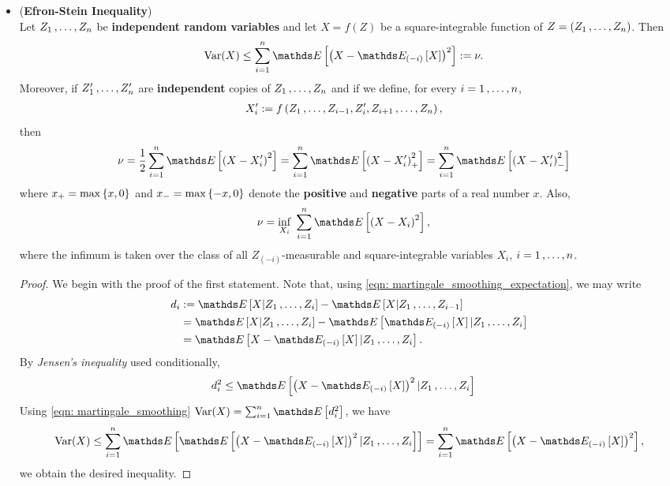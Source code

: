 \documentclass[11pt]{article}
\begin{document}
\begin{itemize}
\item \begin{proposition}(\textbf{Efron-Stein Inequality}) \citep{boucheron2013concentration} \\
Let $Z_1 \,{,}\ldots{,}\, Z_n$ be \textbf{independent random variables} and let $X = f(Z)$ be a square-integrable function of $Z = (Z_1 \,{,}\ldots{,}\, Z_n)$. Then
\begin{align}
\text{Var}(X) &\le  \sum_{i=1}^{n}\E{}{\paren{X - \E{(-i)}{X}}^2} := \nu.  \label{ineqn: efron_stein_inequality}
\end{align}
Moreover, if $Z_1' \,{,}\ldots{,}\, Z_n'$ are \textbf{independent} copies of $Z_1 \,{,}\ldots{,}\, Z_n$ and if we define, for every $i = 1 \,{,}\ldots{,}\, n$,
\begin{align*}
X_i' &:= f\left(Z_1 \,{,}\ldots{,}\, Z_{i-1}, Z_{i}' ,Z_{i+1} \,{,}\ldots{,}\, Z_n\right),
\end{align*}
then
\begin{align*}
\nu &= \frac{1}{2}\sum_{i=1}^{n}\E{}{\paren{X -  X_i'}^2} = \sum_{i=1}^{n}\E{}{\paren{X -  X_i'}_{+}^2} = \sum_{i=1}^{n}\E{}{\paren{X -  X_i'}_{-}^2}
\end{align*}
where $x_{+} = \max\left\{x, 0\right\}$ and $x_{-} = \max\left\{-x, 0\right\}$ denote the \textbf{positive} and \textbf{negative} parts of a real number $x$. Also,
\begin{align*}
\nu &= \inf_{X_i}\;\sum_{i=1}^{n}\E{}{\paren{X -  X_i}^2},
\end{align*}
where the infimum is taken over the class of all $Z_{(-i)}$-measurable and square-integrable variables $X_i$, $i = 1 \,{,}\ldots{,}\, n$.
\end{proposition}
\begin{proof}
We begin with the proof of the first statement. Note that, using \eqref{eqn: martingale_smoothing_expectation}, we may write
\begin{align*}
d_i &:= \E{}{X | Z_1 \xdotx{,} Z_i} - \E{}{X | Z_1 \xdotx{,} Z_{i-1}} \\
&= \E{}{X | Z_1 \xdotx{,} Z_i} - \E{}{ \E{(-i)}{X} | Z_1 \xdotx{,} Z_i}\\
&= \E{}{X -  \E{(-i)}{X} | Z_1 \xdotx{,} Z_i}.
\end{align*}
By \emph{Jensen's inequality} used conditionally,
\begin{align*}
d_i^2 &\le  \E{}{\paren{X -  \E{(-i)}{X}}^2 | Z_1 \xdotx{,} Z_i}
\end{align*} Using  \eqref{eqn: martingale_smoothing} $\text{Var}(X) = \sum_{i=1}^{n}\E{}{d_i^2}$, we have
\begin{align*}
\text{Var}(X)  \le \sum_{i=1}^{n}\E{}{\E{}{\paren{X -  \E{(-i)}{X}}^2 | Z_1 \xdotx{,} Z_i}} = \sum_{i=1}^{n}\E{}{\paren{X - \E{(-i)}{X}}^2},
\end{align*} we obtain the desired inequality. 


\end{proof}
\end{itemize}
\end{document}
